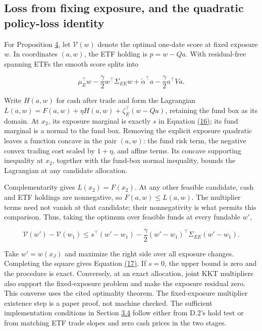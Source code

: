 \documentclass[11pt]{article}
\begin{document}
\subsection{Loss from fixing exposure, and the quadratic policy-loss identity}\label{sec:D.8}

For Proposition \hyperref[res:Proposition-4]{4}, let \(\mathcal V(w)\) denote the optimal one-date score at fixed exposure \(w\). In coordinates \((a,w)\), the ETF holding is \(p=w-Qa\). With residual-free spanning ETFs the smooth score splits into

\begin{equation*}
\mu_E^\top w-\frac\gamma2 w^\top\Sigma_{EE}w
+\tilde\alpha^\top a-\frac\gamma2a^\top Va.
\end{equation*}

Write \(H(a,w)\) for cash after trade and form the Lagrangian \(L(a,w)=F(a,w)+\eta H(a,w)+\zeta_E^\top(w-Qa)\), retaining the fund box as its domain. At \(x_2\), its exposure marginal is exactly \(s\) in Equation \hyperref[eq:16]{(16)}; its fund marginal is a normal to the fund box. Removing the explicit exposure quadratic leaves a function concave in the pair \((a,w)\): the fund risk term, the negative convex trading cost scaled by \(1+\eta\), and affine terms. Its concave supporting inequality at \(x_2\), together with the fund-box normal inequality, bounds the Lagrangian at any candidate allocation.

Complementarity gives \(L(x_2)=F(x_2)\). At any other feasible candidate, cash and ETF holdings are nonnegative, so \(F(a,w)\leq L(a,w)\). The multiplier terms need not vanish at that candidate; their nonnegativity is what permits this comparison. Thus, taking the optimum over feasible funds at every fundable \(w'\),

\begin{equation*}
\mathcal V(w')-\mathcal V(w_1)
\leq s^\top(w'-w_1)
-\frac\gamma2(w'-w_1)^\top\Sigma_{EE}(w'-w_1).
\end{equation*}

Take \(w'=w(x_J)\) and maximize the right side over all exposure changes. Completing the square gives Equation \hyperref[eq:17]{(17)}. If \(s=0\), the upper bound is zero and the procedure is exact. Conversely, at an exact allocation, joint KKT multipliers also support the fixed-exposure problem and make the exposure residual zero. This converse uses the cited optimality theorem. The fixed-exposure multiplier existence step is a paper proof, not machine checked. The sufficient implementation conditions in Section \hyperref[sec:3.4]{3.4} follow either from D.2's hold test or from matching ETF trade slopes and zero cash prices in the two stages.
\end{document}
